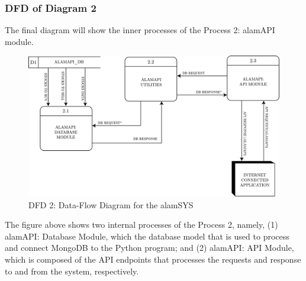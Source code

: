 \subsubsection{DFD of Diagram 2}
\label{subsubsec:dfd2}
The final diagram will show the inner processes of 
the Process 2: alamAPI module.
\begin{figure}[ht]
    \centering
    \includegraphics[width=1\textwidth]{./assets/Chapter_3/DFD/DFD_2.png}
    \caption{DFD 2: Data-Flow Diagram for the alamSYS}
    \label{fig:dfd2}
\end{figure}
\FloatBarrier
\vspace{0.5cm}
The figure above shows two internal processes of the Process 2, namely, 
(1) alamAPI: Database Module, which the database model that is used to process and 
connect MongoDB to the Python program; and 
(2) alamAPI: API Module, which is composed of the API endpoints that processes 
the requests and response to and from the system, respectively.